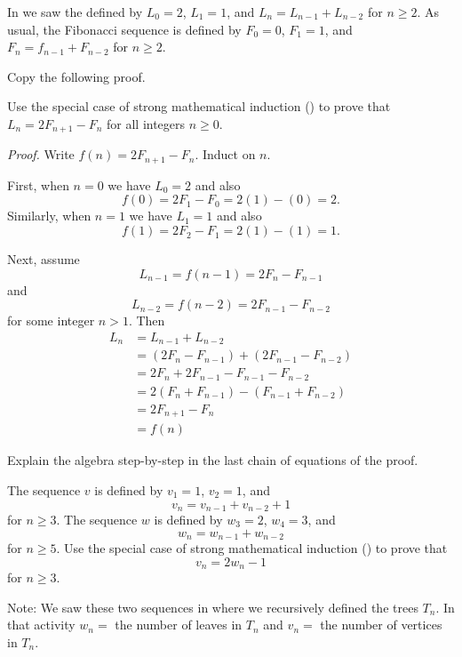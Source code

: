 \begin{act}
\label{act_strong_math_ind_lucas}
    In  we saw the  defined by $L_0=2$, $L_1=1$, and $L_n=L_{n-1}+L_{n-2}$ for $n \ge 2$.   As usual, the Fibonacci sequence is defined by $F_0=0$, $F_1=1$, and $F_n=f_{n-1}+F_{n-2}$ for $n \ge 2$.
        \begin{actpart}
            \item Copy the following proof.

            Use the special case of strong mathematical induction () to prove that $L_n = 2F_{n+1}-F_{n}$ for all integers $n \ge 0$.

            \emph{Proof.} Write $f(n) = 2F_{n+1}-F_{n}$. Induct on $n$.

            First, when $n=0$ we have $L_0=2$ and also 
            $$f(0) =2F_1-F_0=2(1)-(0)=2.$$  Similarly, when $n=1$ we have $L_1=1$ and also $$f(1) =2F_2-F_1=2(1)-(1)=1.$$

            Next, assume $$L_{n-1} = f(n-1)= 2F_n-F_{n-1}$$
            and $$L_{n-2} = f(n-2) = 2F_{n-1}-F_{n-2}$$
            for some integer $n>1$.  Then
                \begin{align*}
                    L_n & = L_{n-1}+L_{n-2} \\ 
                    & = \left(2F_{n}-F_{n-1}\right) + \left(2F_{n-1}-F_{n-2}\right) \\
                    & = 2F_{n}+2F_{n-1} -F_{n-1}-F_{n-2} \\
                    & = 2\left(F_{n}+F_{n-1}\right)-\left(F_{n-1}+F_{n-2}\right) \\
                    & = 2F_{n+1}-F_n \\
                    & = f(n)
                \end{align*}
            \item Explain the algebra step-by-step in the last chain of equations of the proof.
            \item The sequence $v$ is defined by $v_1=1$, $v_2=1$, and $$v_n=v_{n-1}+v_{n-2}+1$$ for $n \ge 3$.  The sequence $w$ is defined by $w_3=2$, $w_4=3$, and $$w_n = w_{n-1}+w_{n-2}$$ for $n\ge 5$.  Use the special case of strong mathematical induction () to prove that  $$v_n=2w_n-1$$ for $n \ge 3$.

            Note: We saw these two sequences in  where we recursively defined the trees $T_n$.  In that activity $w_n=$ the number of leaves in $T_n$ and $v_n=$ the number of vertices in $T_n$.    
        \end{actpart}
\end{act}


